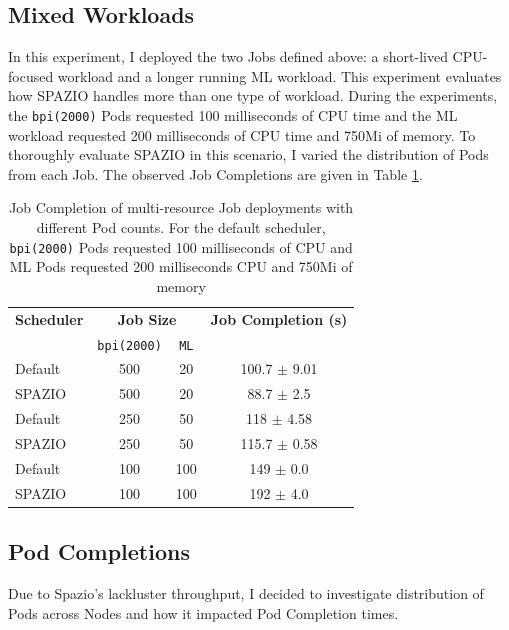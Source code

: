 \subsection{Mixed Workloads}
In this experiment, I deployed the two Jobs defined above: a short-lived
CPU-focused workload and a longer running ML workload. This experiment evaluates
how SPAZIO handles more than one type of workload. During the experiments, the
\texttt{bpi(2000)} Pods requested 100 milliseconds of CPU time and the ML
workload requested 200 milliseconds of CPU time and 750Mi of memory. To
thoroughly evaluate SPAZIO in this scenario, I varied the distribution of Pods
from each Job. The observed Job Completions are given in Table
\ref{tab:mixed-throughput}.

\begin{table}[H]
\centering
    \begin{tabular}{|l|c|c|c|}
    \hline
    \textbf{Scheduler} & \multicolumn{2}{c|}{\textbf{Job Size}} &
        \textbf{Job Completion (s)} \\ \cline{2-3}
        &  \texttt{bpi(2000)} & \texttt{ML} & \\
    \hline
        Default & 500 & 20 & 100.7 $\pm$ 9.01 \\
        SPAZIO & 500 & 20 & 88.7 $\pm$ 2.5 \\
        Default & 250 & 50 & 118 $\pm$ 4.58 \\
        SPAZIO & 250 & 50 & 115.7 $\pm$ 0.58 \\
        Default & 100 & 100 & 149 $\pm$ 0.0 \\
        SPAZIO & 100 & 100 & 192 $\pm$ 4.0 \\
    \hline
    \end{tabular}
    \caption{Job Completion of multi-resource Job deployments with different Pod
    counts. For the default scheduler, \texttt{bpi(2000)} Pods requested 100
    milliseconds of CPU and ML Pods requested 200 milliseconds CPU and 750Mi of
    memory}
    \label{tab:mixed-throughput}
\end{table}

\subsection{Pod Completions}
Due to Spazio's lackluster throughput, I decided to investigate distribution of
Pods across Nodes and how it impacted Pod Completion times.

